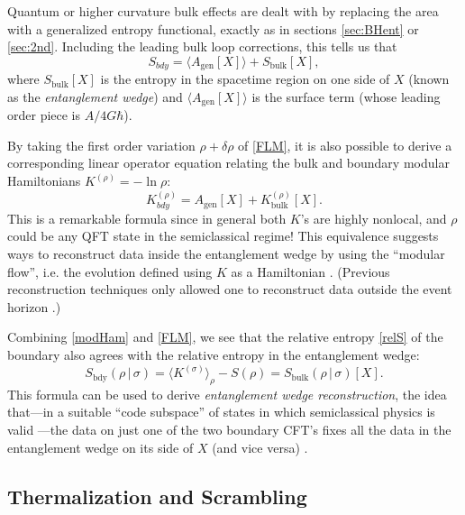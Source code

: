 \documentclass[12pt]{article}
\def\be{\begin{equation}}
\def\ee{\end{equation}}
\begin{document}
Quantum \cite{Barrella:2013wja,Faulkner:2013ana,Engelhardt:2014gca,Dong:2017xht} or higher curvature \cite{solodukhin2008entanglement,fursaev2013distributional,camps2014generalized,dong} bulk effects are dealt with by replacing the area with a generalized entropy functional, exactly as in sections \ref{sec:BHent} or \ref{sec:2nd}.  Including the leading bulk loop corrections, this tells us that 
\be\label{FLM}
S_{bdy} = \langle A_\mathrm{gen}[X]\rangle + S_\mathrm{bulk}[X],
\ee
where $S_\mathrm{bulk}[X]$ is the entropy in the spacetime region on one side of $X$ (known as the \emph{entanglement wedge}) and $\langle A_\mathrm{gen}[X]\rangle$ is the surface term (whose leading order piece is $A/4G\hbar$).

By taking the first order variation $\rho + \delta \rho$ of \eqref{FLM}, it is also possible to derive \cite{Jafferis:2015del,Dong:2016eik} a corresponding linear operator equation relating the bulk and boundary modular Hamiltonians $K^{(\rho)} = -\ln \rho$:
\be\label{modHam}
K^{(\rho)}_{bdy} = A_\mathrm{gen}[X] + K^{(\rho)}_\mathrm{bulk}[X].
\ee 
This is a remarkable formula since in general both $K$'s are highly nonlocal, and $\rho$ could be any QFT state in the semiclassical regime!  This equivalence suggests ways to reconstruct data inside the entanglement wedge by using the ``modular flow'', i.e. the evolution defined using $K$ as a Hamiltonian \cite{Jafferis:2015del,Faulkner:2017vdd,Almheiri:2017fbd}.  (Previous reconstruction techniques only allowed one to reconstruct data outside the event horizon \cite{HKLL}.)

Combining \eqref{modHam} and \eqref{FLM}, we see that the relative entropy \eqref{relS} of the boundary also agrees with the relative entropy in the entanglement wedge:
\be
S_\mathrm{bdy}(\rho \,|\, \sigma) = \langle K^{(\sigma)} \rangle_\rho - S(\rho) = 
S_\mathrm{bulk}(\rho \,|\, \sigma)[X].
\ee
This formula can be used to derive \emph{entanglement wedge reconstruction}, the idea that---in a suitable ``code subspace'' of states in which semiclassical physics is valid \cite{Almheiri:2014lwa,Dong:2016eik}---the data on just one of the two boundary CFT's fixes all the data in the entanglement wedge on its side of $X$ (and vice versa)
\cite{Czech:2012bh,Wall:2012uf,Headrick:2014cta,Pastawski:2015qua,Dong:2016eik}. 
 
\subsection{Thermalization and Scrambling}
\end{document}
